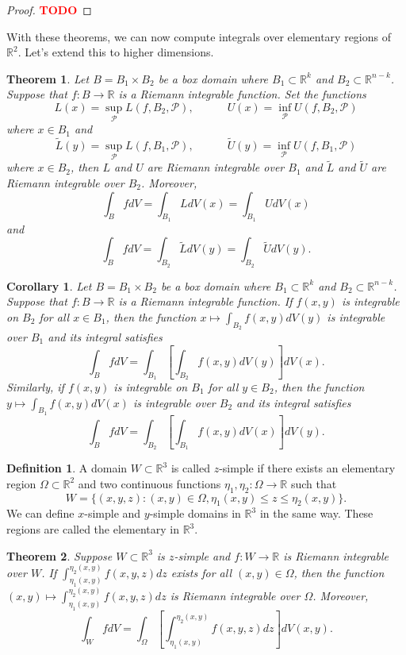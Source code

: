 \documentclass{article}
\theoremstyle{plain}
\newtheorem{theorem}{Theorem}[subsection]
\newtheorem*{corollary}{Corollary}
\theoremstyle{definition}
\newtheorem*{definition}{Definition}
\newcommand{\R}{\mathbb{R}}
\renewcommand{\P}{\mathcal{P}}
\newcommand{\td}{\textcolor{red}{\textbf{TODO}}}
\begin{document}
\begin{proof}
    \td 
\end{proof}

With these theorems, we can now compute integrals over elementary regions of $\R^2$. Let's extend this to higher dimensions.

\begin{theorem}
    Let $B = B_1 \times B_2$ be a box domain where $B_1 \subset \R^k$ and $B_2 \subset \R^{n-k}$. Suppose that $f : B \to \R$ is a Riemann integrable function. Set the functions
    $$L(x) = \sup_{\P}L(f, B_2, \P), \qquad \quad U(x) = \inf_{\P}U(f, B_2, \P)$$
    where $x \in B_1$ and
    $$\tilde{L}(y) = \sup_{\P}L(f, B_1, \P), \qquad \quad \tilde{U}(y) = \inf_{\P}U(f, B_1, \P)$$
    where $x \in B_2$, then $L$ and $U$ are Riemann integrable over $B_1$ and $\tilde{L}$ and $\tilde{U}$ are Riemann integrable over $B_2$. Moreover,
    $$\int_B fdV = \int_{B_1}LdV(x) = \int_{B_1}UdV(x)$$
    and
    $$\int_B fdV = \int_{B_2}\tilde{L}dV(y) = \int_{B_2}\tilde{U}dV(y).$$ 
\end{theorem}

\begin{corollary}
    Let $B = B_1 \times B_2$ be a box domain where $B_1 \subset \R^k$ and $B_2 \subset \R^{n-k}$. Suppose that $f : B \to \R$ is a Riemann integrable function. If $f(x,y)$ is integrable on $B_2$ for all $x \in B_1$, then the function $x \mapsto \int_{B_2}f(x,y)dV(y)$ is integrable over $B_1$ and its integral satisfies
    $$\int_BfdV = \int_{B_1} \left[\int_{B_2}f(x,y)dV(y) \right]dV(x).$$
    Similarly, if $f(x,y)$ is integrable on $B_1$ for all $y \in B_2$, then the function $y \mapsto \int_{B_1}f(x,y)dV(x)$ is integrable over $B_2$ and its integral satisfies
    $$\int_BfdV = \int_{B_2} \left[\int_{B_1}f(x,y)dV(x) \right]dV(y).$$
\end{corollary}

\begin{definition}
    A domain $W \subset \R^3$ is called $z$-simple if there exists an elementary region $\Omega \subset \R^2$ and two continuous functions $\eta_1, \eta_2 : \Omega \to \R$ such that
    $$W = \{(x,y,z): (x,y) \in \Omega, \eta_1(x,y) \leq z \leq \eta_2(x,y)\}.$$
    We can define $x$-simple and $y$-simple domains in $\R^3$ in the same way. These regions are called the elementary in $\R^3$.
\end{definition}

\begin{theorem}
    Suppose $W \subset \R^3$ is $z$-simple and $f : W \to \R$ is Riemann integrable over $W$. If $\int_{\eta_1(x,y)}^{\eta_2(x,y)}f(x,y,z)dz$ exists for all $(x,y) \in \Omega$, then the function $(x,y) \mapsto \int_{\eta_1(x,y)}^{\eta_2(x,y)}f(x,y,z)dz$ is Riemann integrable over $\Omega$. Moreover,
    $$\int_W fdV = \int_{\Omega} \left[\int_{\eta_1(x,y)}^{\eta_2(x,y)}f(x,y,z)dz\right]dV(x,y).$$
\end{theorem}
\end{document}
